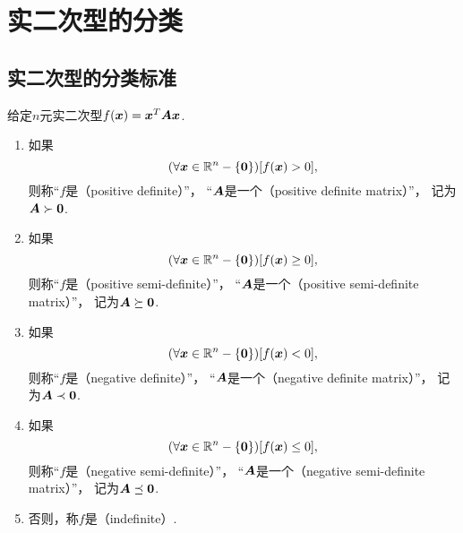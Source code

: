 \section{实二次型的分类}
\subsection{实二次型的分类标准}
\begin{definition}\label{definition:实二次型的分类.实二次型的分类}
给定\(n\)元实二次型\(f(\boldsymbol{x}) = \boldsymbol{x}^T\boldsymbol{A}\boldsymbol{x}\).
\begin{enumerate}
	\item 如果\begin{equation*}
		(\forall\boldsymbol{x}\in\mathbb{R}^n-\{\boldsymbol0\})
		[f(\boldsymbol{x}) > 0],
	\end{equation*}
	则称“\(f\)是（positive definite）”，
	“\(\boldsymbol{A}\)是一个（positive definite matrix）”，
	记为\(\boldsymbol{A}\succ\boldsymbol0\).

	\item 如果\begin{equation*}
		(\forall\boldsymbol{x}\in\mathbb{R}^n-\{\boldsymbol0\})
		[f(\boldsymbol{x}) \geq 0],
	\end{equation*}
	则称“\(f\)是（positive semi-definite）”，
	“\(\boldsymbol{A}\)是一个（positive semi-definite matrix）”，
	记为\(\boldsymbol{A}\succeq\boldsymbol0\).

	\item 如果\begin{equation*}
		(\forall\boldsymbol{x}\in\mathbb{R}^n-\{\boldsymbol0\})
		[f(\boldsymbol{x}) < 0],
	\end{equation*}
	则称“\(f\)是（negative definite）”，
	“\(\boldsymbol{A}\)是一个（negative definite matrix）”，
	记为\(\boldsymbol{A}\prec\boldsymbol0\).

	\item 如果\begin{equation*}
		(\forall\boldsymbol{x}\in\mathbb{R}^n-\{\boldsymbol0\})
		[f(\boldsymbol{x}) \leq 0],
	\end{equation*}
	则称“\(f\)是（negative semi-definite）”，
	“\(\boldsymbol{A}\)是一个（negative semi-definite matrix）”，
	记为\(\boldsymbol{A}\preceq\boldsymbol0\).

	\item 否则，称\(f\)是（indefinite）.
\end{enumerate}
\end{definition}

